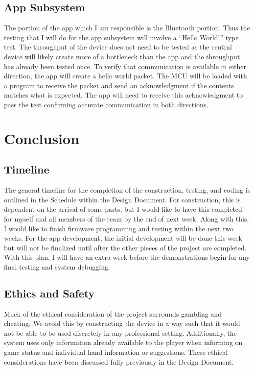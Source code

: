 \documentclass[12pt]{article}
\begin{document}
\subsection{App Subsystem}

The portion of the app which I am responsible is the Bluetooth portion. Thus the testing that I will do for the app subsystem will involve a ``Hello World!'' type test. The throughput of the device does not need to be tested as the central device will likely create more of a bottleneck than the app and the throughput has already been tested once. To verify that communication is available in either direction, the app will create a hello world packet. The MCU will be loaded with a program to receive the packet and send an acknowledgment if the contents matches what is expected. The app will need to receive this acknowledgment to pass the test confirming accurate communication in both directions.

\section{Conclusion}

\subsection{Timeline}

The general timeline for the completion of the construction, testing, and coding is outlined in the Schedule within the Design Document. For construction, this is dependent on the arrival of some parts, but I would like to have this completed for myself and all members of the team by the end of next week. Along with this, I would like to finish firmware programming and testing within the next two weeks. For the app development, the initial development will be done this week but will not be finalized until after the other pieces of the project are completed. With this plan, I will have an extra week before the demonstrations begin for any final testing and system debugging.

\subsection{Ethics and Safety}

Much of the ethical consideration of the project surrounds gambling and cheating. We avoid this by constructing the device in a way such that it would not be able to be used discretely in any professional setting. Additionally, the system uses only information already available to the player when informing on game status and individual hand information or suggestions. These ethical considerations have been discussed fully previously in the Design Document.
\end{document}
